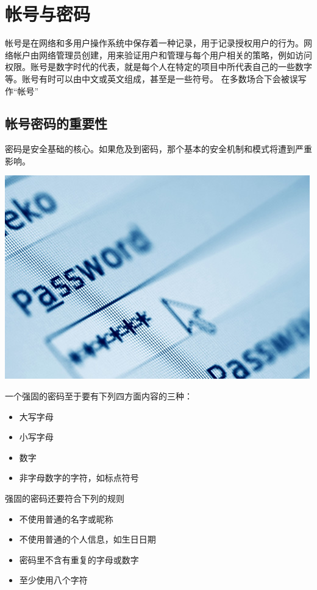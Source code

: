 
\section {帐号与密码}

    帐号是在网络和多用户操作系统中保存着一种记录，用于记录授权用户的行为。网络帐户由网络管理员创建，用来验证用户和管理与每个用户相关的策略，例如访问权限。账号是数字时代的代表，就是每个人在特定的项目中所代表自己的一些数字等。账号有时可以由中文或英文组成，甚至是一些符号。 在多数场合下会被误写作“帐号”

\subsection {帐号密码的重要性}

    密码是安全基础的核心。如果危及到密码，那个基本的安全机制和模式将遭到严重影响。

    \begin{center}
        \includegraphics[scale=.6] {password.jpg}
    \end{center}

    一个强固的密码至于要有下列四方面内容的三种：

    \begin{itemize}
        \item 大写字母
        \item 小写字母
        \item 数字
        \item 非字母数字的字符，如标点符号
    \end{itemize}

    强固的密码还要符合下列的规则

    \begin{itemize}
        \item 不使用普通的名字或昵称
        \item 不使用普通的个人信息，如生日日期
        \item 密码里不含有重复的字母或数字
        \item 至少使用八个字符
    \end{itemize}

